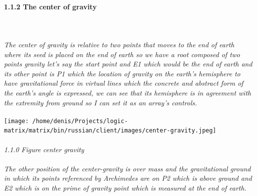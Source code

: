 \paragraph{1.1.2 The center of gravity}
\textbf{\\\\}
\textit{The center of gravity is relative to two points that moves to the end of earth where its seed is placed on the end of earth so we have a root composed of two points gravity let's say the start point and E1 which would be the end of earth and its other point is P1 which the location of gravity on the earth's hemisphere to have gravitational force in virtual lines which the concrete and abstract form of the earth's angle is expressed, we can see that its hemisphere is in agreement with the extremity from  ground so I can set it as an array's controls.}
\textbf{\\\\}
\texttt{[image: /home/denis/Projects/logic-matrix/matrix/bin/russian/client/images/center-gravity.jpeg]}
\textbf{\\\\}
\textit{1.1.0 Figure center gravity}
\textbf{\\\\}
\textit{The other position of the center-gravity is over mass and the gravitational ground in which its points referenced by Archimedes are on P2 which is above ground and E2 which is on the prime of gravity point which is measured at the end of earth.}
\textbf{\\\\}
